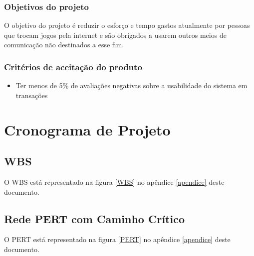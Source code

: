 \documentclass[a4paper,11pt]{article}
\begin{document}
		\subsubsection{Objetivos do projeto}
			O objetivo do projeto é reduzir o esforço e tempo gastos atualmente por pessoas que trocam jogos pela internet e são obrigados a usarem outros meios de comunicação não destinados a esse fim.
			
		\subsubsection{Critérios de aceitação do produto}
			\begin{itemize}
				\item Ter menos de 5\% de avaliações negativas sobre a usabilidade do sistema em transações
			\end{itemize}
	
\section{Cronograma de Projeto}
	\subsection{WBS}
    	O WBS está representado na figura \ref{WBS} no apêndice \ref{apendice} deste documento.
	\subsection{Rede PERT com Caminho Crítico}
		O PERT está representado na figura \ref{PERT} no apêndice \ref{apendice} deste documento.
\end{document}
